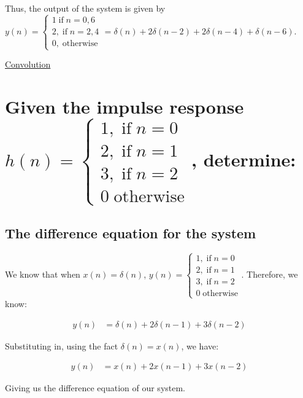 \documentclass{article}
\newenvironment{directsubsubs}{
  \makeatletter
  \renewcommand\thesubsubsection{\thesection.\Roman{subsubsection}}
  \makeatother
}{
  \makeatletter
  \renewcommand\thesubsubsection{\thesubsection.\Roman{subsubsection}}
  \makeatother
}
\renewcommand{\thesubsection}{\thesection.\alph{subsection}}
\renewcommand{\thesubsubsection}{\thesection.\alph{subsection}.\Roman{subsubsection}}
\begin{document}
\begin{directsubsubs}
	Thus, the output of the system is given by $y(n) = \begin{cases} 1 \; \text{if} \; n = 0, 6 \\ 2, \; \text{if} \; n = 2, 4 \\0, \; \text{otherwise} \end{cases} = \delta(n) + 2\delta(n - 2) + 2\delta(n - 4) + \delta(n - 6)$.

\end{directsubsubs}

\newpage

\begin{center}
	\Large{\underline{Convolution}}
\end{center}

\section[Question ~\thesection]{Given the impulse response $h(n) = \begin{cases} 1, \; \text{if} \; n = 0 \\2,  \; \text{if} \; n = 1 \\3, \; \text{if} \; n = 2\\0 \; \text{otherwise} \end{cases}$, determine:}

\subsection[~\thesubsection]{The difference equation for the system}

We know that when $x(n) = \delta(n)$, $y(n) = \begin{cases} 1, \; \text{if} \; n = 0 \\2,  \; \text{if} \; n = 1 \\3, \; \text{if} \; n = 2\\0 \; \text{otherwise} \end{cases}$. Therefore, we know:

\begin{align*}
	y(n) &= \delta(n) + 2\delta(n - 1) + 3\delta(n - 2)
\end{align*}

Substituting in, using the fact $\delta(n) = x(n)$, we have:

\begin{align*}
	y(n) &= x(n) + 2x(n - 1) + 3x(n - 2)
\end{align*}

Giving us the difference equation of our system.
\end{document}
